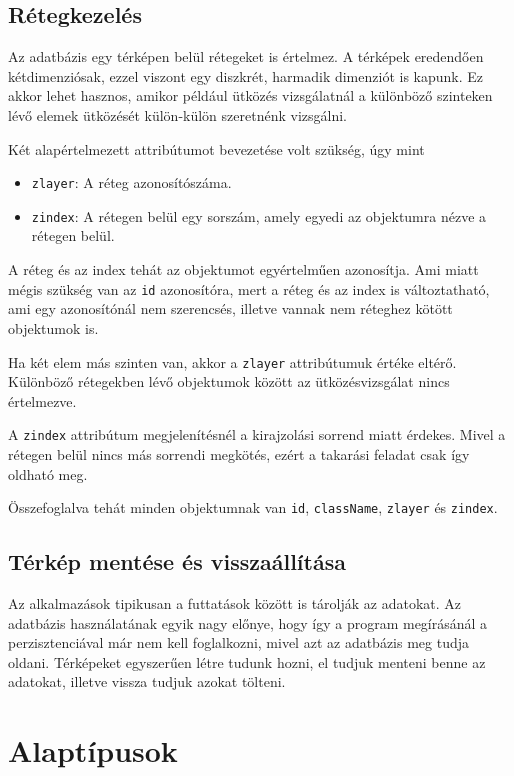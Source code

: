 \subsection{Rétegkezelés}

Az adatbázis egy térképen belül rétegeket is értelmez. A térképek eredendően kétdimenziósak, ezzel viszont egy diszkrét, harmadik dimenziót is kapunk. Ez akkor lehet hasznos, amikor például ütközés vizsgálatnál a különböző szinteken lévő elemek ütközését külön-külön szeretnénk vizsgálni.

Két alapértelmezett attribútumot bevezetése volt szükség, úgy mint
\begin{itemize}
\item \texttt{zlayer}: A réteg azonosítószáma.
\item \texttt{zindex}: A rétegen belül egy sorszám, amely egyedi az objektumra nézve a rétegen belül.
\end{itemize}

A réteg és az index tehát az objektumot egyértelműen azonosítja. Ami miatt mégis szükség van az \texttt{id} azonosítóra, mert a réteg és az index is változtatható, ami egy azonosítónál nem szerencsés, illetve vannak nem réteghez kötött objektumok is.

Ha két elem más szinten van, akkor a \texttt{zlayer} attribútumuk értéke eltérő. Különböző rétegekben lévő objektumok között az ütközésvizsgálat nincs értelmezve.

A \texttt{zindex} attribútum megjelenítésnél a kirajzolási sorrend miatt érdekes. Mivel a rétegen belül nincs más sorrendi megkötés, ezért a takarási feladat csak így oldható meg.

Összefoglalva tehát minden objektumnak van \texttt{id}, \texttt{className}, \texttt{zlayer} és \texttt{zindex}.

\subsection{Térkép mentése és visszaállítása}

Az alkalmazások tipikusan a futtatások között is tárolják az adatokat. Az adatbázis használatának egyik nagy előnye, hogy így a program megírásánál a perzisztenciával már nem kell foglalkozni, mivel azt az adatbázis meg tudja oldani. Térképeket egyszerűen létre tudunk hozni, el tudjuk menteni benne az adatokat, illetve vissza tudjuk azokat tölteni.

\section{Alaptípusok}

